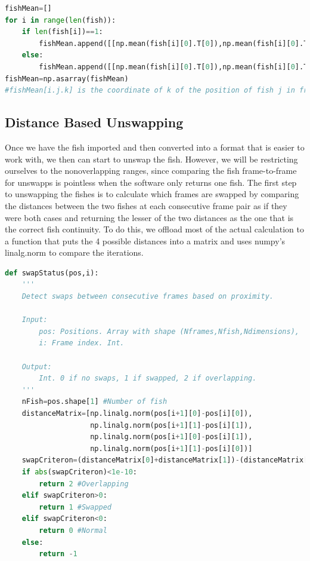 \documentclass[12pt]{article}
\begin{document}
\begin{minipage}[c]{\textwidth}
\begin{lstlisting}[language=Python]
fishMean=[]
for i in range(len(fish)):
    if len(fish[i])==1:
        fishMean.append([[np.mean(fish[i][0].T[0]),np.mean(fish[i][0].T[1])],[np.mean(fish[i][0].T[0]),np.mean(fish[i][0].T[1])]])
    else:
        fishMean.append([[np.mean(fish[i][0].T[0]),np.mean(fish[i][0].T[1])],[np.mean(fish[i][1].T[0]),np.mean(fish[i][1].T[1])]])
fishMean=np.asarray(fishMean)
#fishMean[i.j.k] is the coordinate of k of the position of fish j in frame i
\end{lstlisting}
\end{minipage}

\subsection{Distance Based Unswapping}

Once we have the fish imported and then converted into a format that is easier to work with, we then can start to unswap the fish. However, we will be restricting ourselves to the nonoverlapping ranges, since comparing the fish frame-to-frame for unswapps is pointless when the software only returns one fish. The first step to unswapping the fishes is to calculate which frames are swapped by comparing the distances between the two fishes at each consecutive frame pair as if they were both cases and returning the lesser of the two distances as the one that is the correct fish continuity. To do this, we offload most of the actual calculation to a function that puts the 4 possible distances into a matrix and uses numpy's linalg.norm to compare the iterations.

\begin{minipage}[c]{\textwidth}
\begin{lstlisting}[language=Python]
def swapStatus(pos,i):
    '''
    Detect swaps between consecutive frames based on proximity.
    
    Input:
        pos: Positions. Array with shape (Nframes,Nfish,Ndimensions),
        i: Frame index. Int.
    
    Output:
        Int. 0 if no swaps, 1 if swapped, 2 if overlapping.
    '''
    nFish=pos.shape[1] #Number of fish
    distanceMatrix=[np.linalg.norm(pos[i+1][0]-pos[i][0]),
                    np.linalg.norm(pos[i+1][1]-pos[i][1]),
                    np.linalg.norm(pos[i+1][0]-pos[i][1]),
                    np.linalg.norm(pos[i+1][1]-pos[i][0])]
    swapCriteron=(distanceMatrix[0]+distanceMatrix[1])-(distanceMatrix[2]+distanceMatrix[3])
    if abs(swapCriteron)<1e-10:
        return 2 #Overlapping
    elif swapCriteron>0:
        return 1 #Swapped
    elif swapCriteron<0:
        return 0 #Normal
    else:
        return -1
\end{lstlisting}
\end{minipage}
\end{document}
